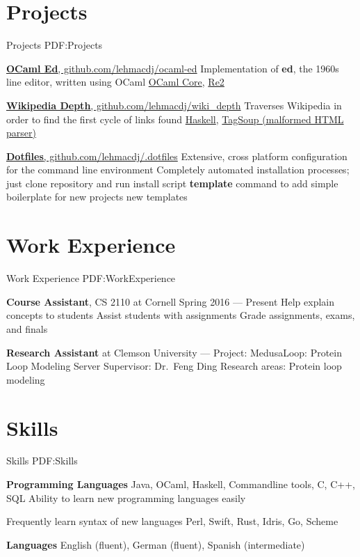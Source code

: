 \documentclass[letterpaper,10pt,oneside]{simpleresume}
\begin{document}
\begin{minipage}[t][0pt]{\linewidth}
\begin{body}
\section%
{Projects}
{Projects}
{PDF:Projects}

\href{https://www.github.com/lehmacdj/ocaml-ed}
{\textbf{OCaml Ed}, github.com/lehmacdj/ocaml-ed}
\BulletItem%
Implementation of \textbf{ed}, the 1960s line editor, written using OCaml
\BulletItem%
\href{https://www.github.com/janestreet/core}
{OCaml Core},
\href{https://www.github.com/janestreet/re2}
{Re2}

\href{https://www.github.com/lehmacdj/wiki_depth}
{\textbf{Wikipedia Depth}, github.com/lehmacdj/wiki\_depth}
\BulletItem%
Traverses Wikipedia in order to find the first cycle of links found
\BulletItem%
\href{https://www.haskell.org}
{Haskell},
\href{https://hackage.haskell.org/package/tagsoup}
{TagSoup (malformed HTML parser)}

\href{https://www.github.com/lehmacdj/.dotfiles}
{\textbf{Dotfiles}, github.com/lehmacdj/.dotfiles}
\BulletItem%
Extensive, cross platform configuration for the command line environment
\BulletItem%
Completely automated installation processes; just clone repository and run
install script
\BulletItem%
\textbf{template} command to add simple boilerplate for new projects
new templates

\section%
{Work Experience}
{Work Experience}
{PDF:WorkExperience}

\textbf{Course Assistant}, CS 2110 at Cornell
\hfill
Spring 2016 --- Present
\BulletItem%
Help explain concepts to students
\BulletItem%
Assist students with assignments
\BulletItem%
Grade assignments, exams, and finals

\textbf{Research Assistant} at Clemson University
\hfill
{} --- 
\BulletItem%
Project:
MedusaLoop: Protein Loop Modeling Server
\BulletItem%
Supervisor:
Dr.\ Feng Ding
\BulletItem%
Research areas:
Protein loop modeling

\section%
{Skills}
{Skills}
{PDF:Skills}

\textbf{Programming Languages}
\BulletItem%
Java, OCaml, Haskell, Commandline tools, C, C++, SQL
\BulletItem%
Ability to learn new programming languages easily
\begin{detail}
\SubBulletItem%
Frequently learn syntax of new languages
\SubBulletItem%
Perl, Swift, Rust, Idris, Go, Scheme
\end{detail}
\textbf{Languages}
\BulletItem%
English (fluent), German (fluent), Spanish (intermediate)
\end{body}

\end{minipage}
\end{document}
